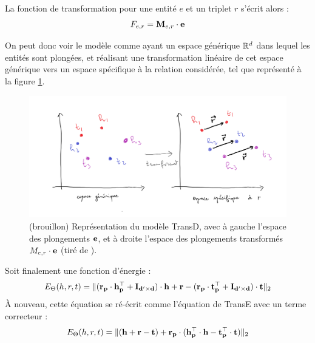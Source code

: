 La fonction de transformation pour une entité $e$ et un triplet $r$ s'écrit alors :
\begin{equation}
    \label{eq:kge-transd-function}
    F_{e, r} = \bf{M}_{e, r} \cdot \bf{e}
\end{equation}

On peut donc voir le modèle comme ayant un espace générique $\R^d$ dans lequel les entités sont plongées, et réalisant une transformation linéaire de cet espace générique vers un espace spécifique à la relation considérée, tel que représenté à la figure \ref{fig:transd-schema}.

\begin{figure}[h]
    \centering
    \includegraphics[width=\textwidth]{img/transd_schema.png}
    \caption[Principe du modèle TransD]{(brouillon) Représentation du modèle TransD, avec à gauche l'espace des plongements $\bf{e}$, et à droite l'espace des plongements transformés $M_{e, r} \cdot \bf{e}$ (tiré de \cite{transd}).}
    \label{fig:transd-schema}
\end{figure}

Soit finalement une fonction d'énergie :
\begin{equation}
    E_\Theta(h, r, t) = \| (\bf{r_p \cdot h_p^\top + I_{d' \times d}}) \cdot \bf{h} + \mathbf{r} - (\bf{r_p \cdot t_p^\top + I_{d' \times d}}) \cdot \bf{t} \|_2 
\end{equation}
À nouveau, cette équation se ré-écrit comme l'équation de TransE avec un terme correcteur :
\begin{equation}
    E_\Theta(h, r, t) = \| (\bf{h + r - t}) + \bf{r_p} \cdot (\bf{ h_p^\top \cdot h - t_p^\top \cdot t}) \|_2 
\end{equation}


